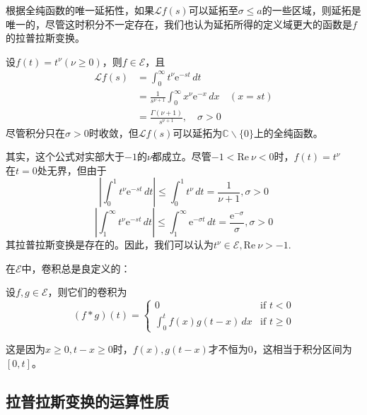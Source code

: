 \documentclass{ctexbook}
\begin{document}
根据全纯函数的唯一延拓性，如果$\mathcal{L} f(s)$可以延拓至$\sigma\leq a$的一些区域，则延拓是唯一的，尽管这时积分不一定存在，我们也认为延拓所得的定义域更大的函数是$f$的拉普拉斯变换。
\begin{example}[多项式的拉普拉斯变换]
    设$f(t)=t^\nu(\nu\geq 0)$，则$f\in\mathcal{E} $，且
    \begin{align*}
        \mathcal{L} f(s)&=\int_0^{\infty}t^\nu \mathrm{e}^{-st}\,dt\\
        &=\frac{1}{s^{\nu+1}}\int_0^{\infty}x^\nu \mathrm{e}^{-x}\,dx&(x=st)\\
        &=\frac{\Gamma(\nu+1)}{s^{\nu+1}},\quad \sigma>0
    \end{align*}
尽管积分只在$\sigma>0$时收敛，但$\mathcal{L} f(s)$可以延拓为$\mathbb{C}\backslash\{0\}$上的全纯函数。
\begin{remark}
    其实，这个公式对实部大于$-1$的$\nu$都成立。尽管$-1<\text{Re}\ \nu<0$时，$f(t)=t^\nu$\\
    在$t=0$处无界，但由于
\[\left|\int_{0}^{1}t^{\nu}\mathrm{e}^{-st}\,dt\right|\leq \int_0^1 t^\nu\,dt=\frac{1}{\nu+1},\sigma>0\]
\[\left|\int_{1}^{\infty}t^{\nu}\mathrm{e}^{-st}\,dt\right|\leq \int_1^\infty \mathrm{e}^{-\sigma t}\,dt=\frac{\mathrm{e}^{-\sigma}}{\sigma},\sigma>0\]
其拉普拉斯变换是存在的。因此，我们可以认为$t^\nu\in\mathcal{E},\text{Re}\ \nu>-1$.
\end{remark}
\end{example}

在$\mathcal{E} $中，卷积总是良定义的：
\begin{proposition}
    设$f,g\in\mathcal{E} $，则它们的卷积为
    \[(f*g)(t)=\begin{cases}
    0                   & \text{if } t<0 \\
    \int_0^t f(x)g(t-x)\,dx & \text{if } t\geq 0
    \end{cases}\]
\end{proposition}
这是因为$x\geq 0,t-x\geq 0$时，$f(x),g(t-x)$才不恒为0，这相当于积分区间为$[0,t]$。

\subsection{拉普拉斯变换的运算性质}\label{sub:laplace_operation}
\end{document}
